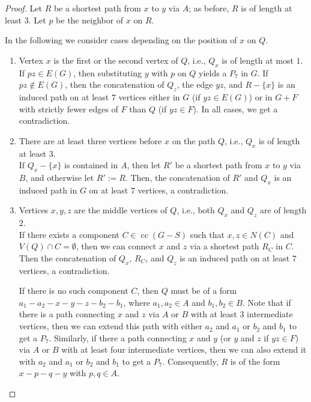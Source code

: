 \documentclass[11pt,a4paper]{article}
\DeclareMathOperator{\cc}{cc}
\theoremstyle{definition}
\renewcommand{\varnothing}{\emptyset}
\begin{document}
\begin{proof}
    Let $R$ be a shortest path from $x$ to $y$ via $A$; as before, $R$ is of length at least $3$. Let $p$ be the neighbor of $x$ on $R$.
    
    In the following we consider cases depending on the position of $x$ on $Q$.

        \begin{enumerate}
            \item Vertex $x$ is the first or the second vertex of $Q$, i.e., $Q_x$ is of length at most $1$.  \\ 
            If $pz\in E(G)$, then substituting $y$ with $p$ on $Q$ yields a $P_7$ in $G$.
            If $pz\notin E(G)$, then the concatenation of $Q_z$, the edge $yz$,
            and $R-\{x\}$ is an induced path on at least $7$ vertices 
            either in $G$ (if $yz \in E(G)$) or in $G+F$ with strictly fewer edges of $F$
            than $Q$ (if $yz \in F$). In all cases, we get a contradiction.
            
            \item There are at least three vertices before $x$ on the path $Q$, i.e., 
            $Q_x$ is of length at least $3$. 
            \\ 
            If $Q_x-\{x\}$ is contained in $A$, then let $R'$ be a shortest path from $x$ to $y$ via $B$, and otherwise let $R' := R$. Then, the concatenation of $R'$ and $Q_x$
            is an induced path in $G$ on at least $7$ vertices, a contradiction.
            
            \item Vertices $x,y,z$ are the middle vertices of $Q$, i.e., both $Q_x$ and $Q_z$ are of length $2$. \\ If there exists a component $C\in \cc(G-S)$ such that $x,z\in N(C)$ and $V(Q)\cap C = \varnothing$, then we can  connect $x$ and $z$ via a shortest path $R_C$ in $C$. Then the concatenation of $Q_x$, $R_C$, and $Q_z$
            is an induced path on at least $7$ vertices, a contradiction.
            
            If there is no such component $C$, then $Q$ must be of a form $a_1 - a_2 - x-y-z-b_2- b_1$, where $a_1,a_2\in A$ and $b_1, b_2\in B$. Note that if there is a path connecting $x$ and $z$ via $A$ or $B$ with at least $3$ intermediate vertices, then we can extend this path with either $a_2$ and $a_1$ or $b_2$ and $b_1$ to get a $P_7$. Similarly, if there a path connecting $x$ and $y$ (or $y$ and $z$ if $yz\in F$) via $A$ or $B$ with at least four intermediate vertices, then we can also extend it 
            with $a_2$ and $a_1$ or $b_2$ and $b_1$ to get a $P_7$.
            Consequently, $R$ is of the form $x - p - q- y$ with $p,q \in A$.
            

\end{enumerate}
\end{proof}
\end{document}
